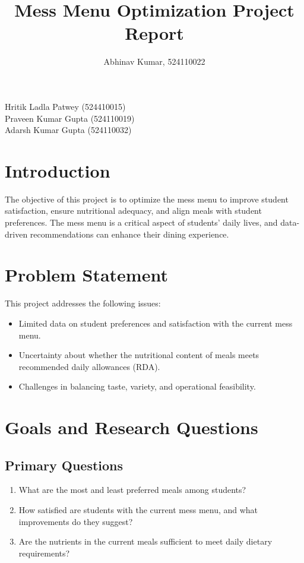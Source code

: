 \documentclass[12pt,a4paper]{article}
\title{\textbf{Mess Menu Optimization Project Report}}
\author{Abhinav Kumar, 524110022}
\date{}
\begin{document}
\maketitle
\begin{center}
    Hritik Ladla Patwey (524410015) \\ 
    Praveen Kumar Gupta (524110019) \\ 
    Adarsh Kumar Gupta (524110032) \\ 
\end{center}
\newpage

\section{Introduction}
The objective of this project is to optimize the mess menu to improve student satisfaction, ensure nutritional adequacy, and align meals with student preferences. The mess menu is a critical aspect of students' daily lives, and data-driven recommendations can enhance their dining experience.

\section{Problem Statement}
This project addresses the following issues:
\begin{itemize}
    \item Limited data on student preferences and satisfaction with the current mess menu.
    \item Uncertainty about whether the nutritional content of meals meets recommended daily allowances (RDA).
    \item Challenges in balancing taste, variety, and operational feasibility.
\end{itemize}

\section{Goals and Research Questions}
\subsection{Primary Questions}
\begin{enumerate}
    \item What are the most and least preferred meals among students?
    \item How satisfied are students with the current mess menu, and what improvements do they suggest?
    \item Are the nutrients in the current meals sufficient to meet daily dietary requirements?
\end{enumerate}
\end{document}
